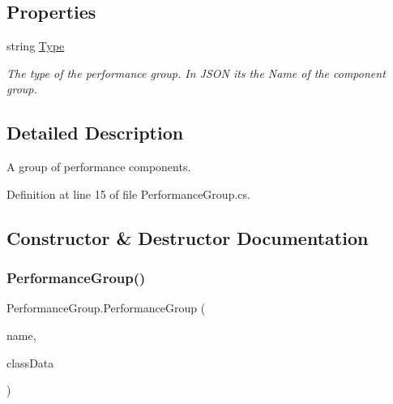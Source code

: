 \subsection*{Properties}
\begin{DoxyCompactItemize}
\item 
string \hyperlink{class_performance_group_a05385bccfa54530d1232ee250c3df825}{Type}
\begin{DoxyCompactList}\small\item\em The type of the performance group. In J\+S\+ON its the \textquotesingle{}Name\textquotesingle{} of the component group. \end{DoxyCompactList}\end{DoxyCompactItemize}


\subsection{Detailed Description}
A group of performance components. 



Definition at line 15 of file Performance\+Group.\+cs.



\subsection{Constructor \& Destructor Documentation}
\mbox{\label{class_performance_group_a47f33a89205365df4b464e20277d1b1b}} 
\subsubsection{\texorpdfstring{Performance\+Group()}{PerformanceGroup()}\hspace{0.1cm}{\footnotesize\ttfamily [1/2]}}
{\footnotesize\ttfamily Performance\+Group.\+Performance\+Group (\begin{DoxyParamCaption}\item[{string}]{name,  }\item[{List$<$ \hyperlink{struct_u_i_class_data}{U\+I\+Class\+Data} $>$}]{class\+Data }\end{DoxyParamCaption})}




